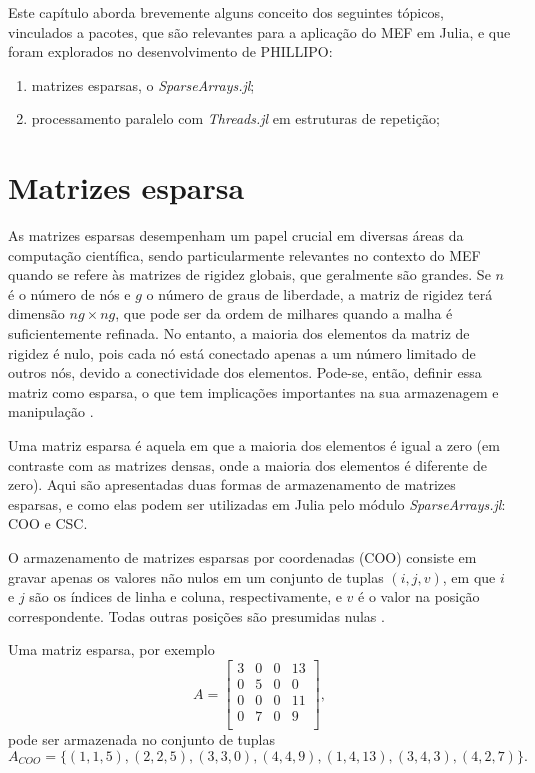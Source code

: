Este capítulo aborda brevemente alguns conceito dos seguintes tópicos, vinculados a pacotes, que são relevantes para a aplicação do MEF em Julia, e que foram explorados no desenvolvimento de PHILLIPO:

\begin{enumerate}
    \item matrizes esparsas, o \emph{SparseArrays.jl};
    \item processamento paralelo com \emph{Threads.jl} em estruturas de repetição;
\end{enumerate}


\section{Matrizes esparsa}

As matrizes esparsas desempenham um papel crucial em diversas áreas da computação científica, sendo particularmente relevantes no contexto do MEF quando se refere às matrizes de rigidez globais, que geralmente são grandes. Se $n$ é o número de nós e $g$ o número de graus de liberdade, a matriz de rigidez terá dimensão $ng \times ng$, que pode ser da ordem de milhares quando a malha é suficientemente refinada. No entanto, a maioria dos elementos da matriz de rigidez é nulo, pois cada nó está conectado apenas a um número limitado de outros nós, devido a conectividade dos elementos. Pode-se, então, definir essa matriz como esparsa, o que tem implicações importantes na sua armazenagem e manipulação \cite{LOGAN}.

Uma matriz esparsa é aquela em que a maioria dos elementos é igual a zero (em contraste com as matrizes densas, onde a maioria dos elementos é diferente de zero). Aqui são apresentadas duas formas de armazenamento de matrizes esparsas, e como elas podem ser utilizadas em Julia pelo módulo \emph{SparseArrays.jl}: COO e CSC.

O armazenamento de matrizes esparsas por coordenadas (COO) consiste em gravar apenas os valores não nulos em um conjunto de tuplas $(i, j, v)$, em que $i$ e $j$ são os índices de linha e coluna, respectivamente, e $v$ é o valor na posição correspondente. Todas outras posições são presumidas nulas \cite{sparse}. 

Uma matriz esparsa, por exemplo
\begin{equation}
    A = 
    \begin{bmatrix}
        3 & 0 & 0 & 13 \\
        0 & 5 & 0 & 0 \\
        0 & 0 & 0 & 11 \\
        0 & 7 & 0 & 9 \\
    \end{bmatrix},
    \label{eq:coo_matrix}
\end{equation}
pode ser armazenada no conjunto de tuplas
\begin{equation}
    A_{COO} = \{(1,1,5), (2,2,5), (3,3,0), (4,4,9), (1,4,13), (3,4,3), (4,2,7)\}.
    \label{eq:coo}
\end{equation}

